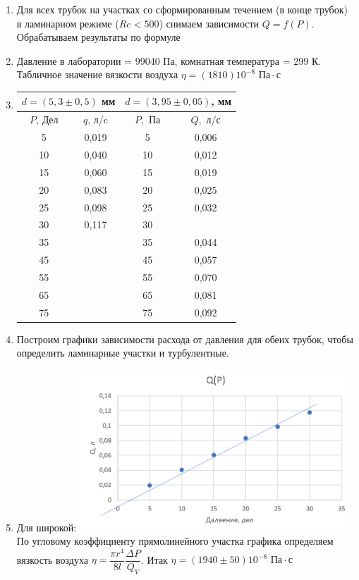 \documentclass[a4paper, 12pt]{article}%
\begin{document}
\begin{enumerate}
\item Для всех трубок на участках со сформированным течением (в конце
трубок) в ламинарном режиме ($Re < 500$) снимаем зависимости $Q = f(P)$. Обрабатываем результаты по формуле 
\item Давление в лаборатории = 99040 Па, комнатная температура = 299 К. Табличное значение вязкости воздуха $\eta = (1810)10^{-8} \text{ Па} \cdot \text{с}$
\item 
\begin{tabular}{|c|c|c|c|}
\hline
\multicolumn{2}{|c|}{$d = (5,3 \pm 0,5)$ мм} & \multicolumn{2}{c|}{$d = (3,95 \pm 0,05)$, мм} \\ \hline
$P$, Дел & $q$, л/c & $P, \text{ Па}$ & $Q, \text{ л/с}$ \\ \hline
5  & 0,019 & 5  & 0,006   \\ \hline
10 & 0,040 & 10 & 0,012   \\ \hline
15 & 0,060 & 15 & 0,019   \\ \hline
20 & 0,083 & 20 & 0,025   \\ \hline
25 & 0,098 & 25 & 0,032   \\ \hline
30 & 0,117 & 30 &         \\ \hline
35 &       & 35 & 0,044   \\ \hline
45 &       & 45 & 0,057   \\ \hline
55 &       & 55 & 0,070   \\ \hline
65 &       & 65 & 0,081   \\ \hline
75 &       & 75 & 0,092   \\ \hline
\end{tabular}

\item Построим графики зависимости расхода от давления для обеих трубок, чтобы определить ламинарные участки и турбулентные.

\item Для широкой:
\includegraphics[width = 0.8\textwidth]{широкая.png}
По угловому коэффициенту прямолинейного участка графика определяем вязкость воздуха $\eta = \dfrac{\pi r^4}{8l} \dfrac{\Delta P}{Q_V}$. Итак $\eta = (1940 \pm 50)10^{-8} \text{ Па} \cdot \text{с}$


\end{enumerate}
\end{document}
